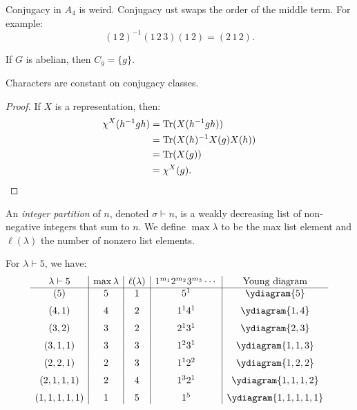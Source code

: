 \begin{recall}
	Conjugacy in $A_4$ is weird. Conjugacy ust swaps the order of the middle term. For example:
	\[
		(1\,2)^{-1}(1\,2\,3)(1\,2) = (2\,1\,2).
	\] 
\end{recall}

\begin{example}
	If $G$ is abelian, then $C_g = \{g\}$.
\end{example}

\begin{theorem}\label{thm:chars-const-conj}
	Characters are constant on conjugacy classes.
\end{theorem}
	\begin{proof}
		If $X$ is a representation, then:
		\begin{align*}
			\chi^X(h^{-1}gh)
			&= \operatorname{Tr}(X(h^{-1}gh)) \\
			&= \operatorname{Tr}(X(h)^{-1}X(g)X(h)) \\
			&= \operatorname{Tr}(X(g)) \\
			&= \chi^X(g). \qedhere
		\end{align*}
	\end{proof}

\begin{definition}
	An \emph{integer partition} of $n$, denoted $\sigma \vdash n$, is a weakly decreasing list of non-negative integers that sum to $n$. We define $\max \lambda$ to be the max list element and $\ell(\lambda)$ the number of nonzero list elements.
\end{definition}

\begin{example}
	For $\lambda \vdash 5$, we have:
\[
\begin{array}{c|c|c|c|c}
\lambda \vdash 5 & \max \lambda & \ell(\lambda)
& 1^{m_1}2^{m_2}3^{m_3}\cdots
& \mathrm{Young\ diagram} \\ \hline
(5)         & 5 & 1 & 5^1
& \ydiagram{5} \\[6pt]
(4,1)       & 4 & 2 & 1^1 4^1
& \ydiagram{1,4} \\[6pt]
(3,2)       & 3 & 2 & 2^1 3^1
& \ydiagram{2,3} \\[6pt]
(3,1,1)     & 3 & 3 & 1^2 3^1
& \ydiagram{1,1,3} \\[6pt]
(2,2,1)     & 2 & 3 & 1^1 2^2
& \ydiagram{1,2,2} \\[6pt]
(2,1,1,1)   & 2 & 4 & 1^3 2^1
& \ydiagram{1,1,1,2} \\[6pt]
(1,1,1,1,1) & 1 & 5 & 1^5
& \ydiagram{1,1,1,1,1}
\end{array}
\]\end{example}

